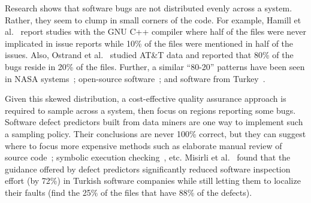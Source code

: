 \documentclass{NSF}
\begin{document}
\begin{nsfdescription}
 Research shows
that software bugs are not distributed evenly across
a system. Rather, they seem to clump in small corners of the code. For example,
Hamill et al.~\cite{hamill09} report studies with the GNU C++ compiler
where half of the files were never implicated in issue reports while 10\% of
the files were mentioned in half of the issues. Also,
Ostrand et al.~\cite{Ostrand:2004} studied
AT\&T data and reported that 80\% of the bugs reside in 20\% of the files.
Further, a similar ``80-20'' patterns have been seen in NASA systems~\cite{hamill09};
open-source software~\cite{koru2009investigation}; and software
from Turkey~\cite{misirli2011ai}. 

Given this skewed distribution,  a
cost-effective   quality assurance approach is required to  sample
across a   system, then focus  on regions reporting some
bugs.
Software defect predictors built from data miners are 
 one way to implement such a sampling policy.   Their conclusions
are never 100\% correct, but they can  suggest where to focus more expensive  methods such as elaborate manual
review of source code~\cite{Shull:2001}; symbolic execution checking~\cite{paaareanu2008combining}, etc.
 Misirli et al.~\cite{misirli2011ai} found that  the guidance offered by
defect predictors
significantly reduced  
software inspection effort (by 72\%) in  Turkish software companies 
while still     letting them to localize
their faults (find the  25\% of the files that
have 88\% of the defects).



\end{nsfdescription}
\end{document}
